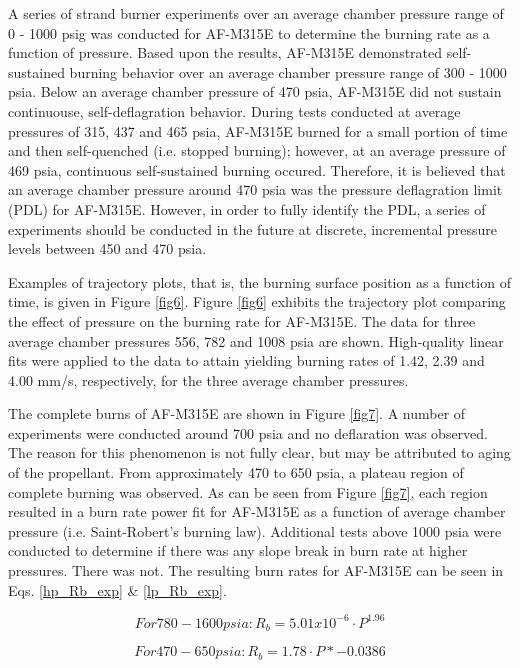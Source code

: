 \documentclass{article}
\begin{document}
A series of strand burner experiments over an average chamber pressure range of 0 - 1000 psig was conducted for 
AF-M315E to determine the burning rate as a function of pressure. Based upon the results, AF-M315E demonstrated
self-sustained burning behavior over an average chamber pressure range of 300 - 1000 psia. Below an average 
chamber pressure of 470 psia, AF-M315E did not sustain continuouse, self-deflagration behavior. During tests
conducted at average pressures of 315, 437 and 465 psia, AF-M315E burned for a small portion of time and then
self-quenched (i.e. stopped burning); however, at an average pressure of 469 psia, continuous self-sustained
burning occured. Therefore, it is believed that an average chamber pressure around 470 psia was the pressure
deflagration limit (PDL) for AF-M315E. However, in order to fully identify the PDL, a series of experiments 
should be conducted in the future at discrete, incremental pressure levels between 450 and 470 psia.

Examples of trajectory plots, that is, the burning surface position as a function of time, is given in Figure
\ref{fig6}. Figure \ref{fig6} exhibits the trajectory plot comparing the effect of pressure on the burning rate
for AF-M315E. The data for three average chamber pressures 556, 782 and 1008 psia are shown. High-quality linear
fits were applied to the data to attain yielding burning rates of 1.42, 2.39 and 4.00 mm/s, respectively, for
the three average chamber pressures.

The complete burns of AF-M315E are shown in Figure \ref{fig7}. A number of experiments were conducted around 700
psia and no deflaration was observed. The reason for this phenomenon is not fully clear, but may be attributed to
aging of the propellant. From approximately 470 to 650 psia, a plateau region of complete burning was observed. As
can be seen from Figure \ref{fig7}, each region resulted in a burn rate power fit for AF-M315E as a function of 
average chamber pressure (i.e. Saint-Robert's burning law). Additional tests above 1000 psia were conducted to
determine if there was any slope break in burn rate at higher pressures. There was not. The resulting burn rates 
for AF-M315E can be seen in Eqs. \ref{hp_Rb_exp} \& \ref{lp_Rb_exp}. 

\begin{equation} \label{hp_Rb_exp}
For 780 - 1600 psia:	R_b=5.01x10^{-6} \cdot P^1.96
\end{equation}

\begin{equation} \label{lp_Rb_exp}
For 470 - 650 psia:	R_b=1.78 \cdot P*{-0.0386}
\end{equation}
\end{document}
